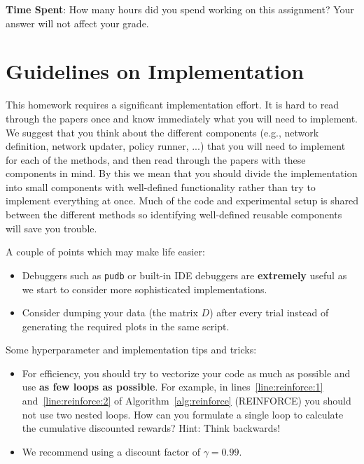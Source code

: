 \documentclass[12pt]{article}
\begin{document}
\vspace{2em}
\noindent\textbf{Time Spent}: How many hours did you spend working on this assignment? Your answer will not affect your grade.



\newpage

\section*{Guidelines on Implementation}
\label{sec:guidelines}
This homework requires a significant implementation effort. It is hard to read through the papers once and know immediately what you will need to implement. We suggest that you think about the different components (e.g., network definition, network updater, policy runner, ...) that you will need to implement for each of the methods, and then read through the papers with these components in mind. By this we mean that you should divide the implementation into small components with well-defined functionality rather than try to implement everything at once. Much of the code and experimental setup is shared between the different methods so identifying well-defined reusable components will save you trouble.

A couple of points which may make life easier:
\begin{itemize}
    
    \item Debuggers such as \texttt{pudb} or built-in IDE debuggers are \textbf{extremely} useful as we start to consider more sophisticated implementations.
    \item Consider dumping your data (the matrix $D$) after every trial instead of generating the required plots in the same script.
\end{itemize}

Some hyperparameter and implementation tips and tricks:
\begin{itemize}
    \item For efficiency, you should try to vectorize your code as much as possible and use \textbf{as few loops as possible}. For example, in lines~\ref{line:reinforce:1} and~\ref{line:reinforce:2} of Algorithm~\ref{alg:reinforce} (REINFORCE) you should not use two nested loops. How can you formulate a single loop to calculate the cumulative discounted rewards? Hint: Think backwards!
    
    \item We recommend using a discount factor of $\gamma = 0.99$.
\end{itemize}
\end{document}
